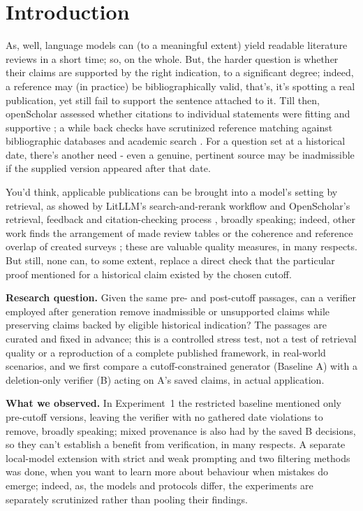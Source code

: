 \documentclass[12pt,a4paper]{article}
\begin{document}
\section{Introduction}
As, well, language models can (to a meaningful extent) yield readable literature reviews in a short time; so, on the whole. But, the harder question is whether their claims are supported by the right indication, to a significant degree; indeed, a reference may (in practice) be bibliographically valid, that's, it's spotting a real publication, yet still fail to support the sentence attached to it. Till then, openScholar assessed whether citations to individual statements were fitting and supportive \cite{asai2024}; a while back checks have scrutinized reference matching against bibliographic databases and academic search \cite{tang2025}. For a question set at a historical date, there's another need - even a genuine, pertinent source may be inadmissible if the supplied version appeared after that date.

You'd think, applicable publications can be brought into a model's setting by retrieval, as showed by LitLLM's search-and-rerank workflow \cite{agarwal2025} and OpenScholar's retrieval, feedback and citation-checking process \cite{asai2024}, broadly speaking; indeed, other work finds the arrangement of made review tables \cite{newman2024} or the coherence and reference overlap of created surveys \cite{shi2025}; these are valuable quality measures, in many respects. But still, none can, to some extent, replace a direct check that the particular proof mentioned for a historical claim existed by the chosen cutoff.

\textbf{Research question.} Given the same pre- and post-cutoff passages, can a verifier employed after generation remove inadmissible or unsupported claims while preserving claims backed by eligible historical indication? The passages are curated and fixed in advance; this is a controlled stress test, not a test of retrieval quality or a reproduction of a complete published framework, in real-world scenarios, and we first compare a cutoff-constrained generator (Baseline A) with a deletion-only verifier (B) acting on A's saved claims, in actual application.

\textbf{What we observed.} In Experiment~1 the restricted baseline mentioned only pre-cutoff versions, leaving the verifier with no gathered date violations to remove, broadly speaking; mixed provenance is also had by the saved B decisions, so they can't establish a benefit from verification, in many respects. A separate local-model extension with strict and weak prompting and two filtering methods was done, when you want to learn more about behaviour when mistakes do emerge; indeed, as, the models and protocols differ, the experiments are separately scrutinized rather than pooling their findings.
\end{document}
